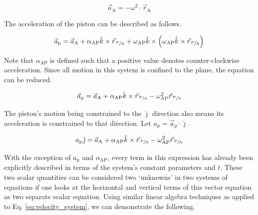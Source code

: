 \documentclass[nofoot,pdf-a,balance,colorlinks,upint,subscriptcorrection,varvw,mathalfa=cal=boondoxo]{asmeconf}
\begin{document}
    \begin{equation}
        \vec{a}_{\textrm{A}} = - \omega^2\cdot\vec{r}_{\textrm{A}}
    \end{equation}

    The acceleration of the piston can be described as follows.


    \begin{equation}
        \vec{a}_{\textrm{p}} = \vec{a}_{\textrm{A}} + \alpha_{\textrm{AP}}\hat{k} \times \vec{r}_{\,\sfrac{\textrm{P}}{\textrm{A}}} + \omega_{\textrm{AP}}\hat{k}\times \left(\omega_{\textrm{AP}}\hat{k}\times \vec{r}_{\,\sfrac{\textrm{P}}{\textrm{A}}}\right)
    \end{equation}

    Note that $\alpha_{\textrm{AP}}$ is defined such that a positive value denotes counter-clockwise acceleration. Since all motion in this system is confined to the plane, the equation can be reduced.

    \begin{equation}\label{eq:piston_accel}
        \vec{a}_{\textrm{p}} = \vec{a}_{\textrm{A}} + \alpha_{\textrm{AP}}\hat{k} \times \vec{r}_{\,\sfrac{\textrm{P}}{\textrm{A}}} - \omega_{\textrm{AP}}^2 \vec{r}_{\,\sfrac{\textrm{P}}{\textrm{A}}}
    \end{equation}

    The piston's motion being constrained to the $\hat{\jmath}$ direction also means its acceleration is constrained to that direction. Let $a_{\textrm{p}} = \vec{a}_{\textrm{p}}\cdot\hat{\jmath}$.

    \begin{equation}
         a_{\textrm{p}}\hat{\jmath}= \vec{a}_{\textrm{A}} + \alpha_{\textrm{AP}}\hat{k} \times \vec{r}_{\,\sfrac{\textrm{P}}{\textrm{A}}} - \omega_{\textrm{AP}}^2 \vec{r}_{\,\sfrac{\textrm{P}}{\textrm{A}}}
    \end{equation}

    With the exception of $a_{\textrm{p}}$ and $\alpha_{\textrm{AP}}$, every term in this expression has already been explicitly described in terms of the system's constant parameters and $t$. These two scalar quantities can be considered two `unknowns' in two systems of equations if one looks at the horizontal and vertical terms of this vector equation as two separate scalar equation. Using similar linear algebra techniques as applied to Eq. \eqref{eq:velocity_system}, we can demonstrate the following.

    
\end{document}
